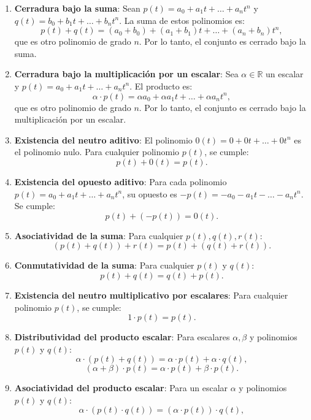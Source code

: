 \documentclass{article}
\begin{document}
\begin{enumerate}
    \item \textbf{Cerradura bajo la suma}: Sean \( p(t) = a_0 + a_1 t + \dots + a_n t^n \) y \( q(t) = b_0 + b_1 t + \dots + b_n t^n \). La suma de estos polinomios es:
    \[
    p(t) + q(t) = (a_0 + b_0) + (a_1 + b_1)t + \dots + (a_n + b_n)t^n,
    \]
    que es otro polinomio de grado \( n \). Por lo tanto, el conjunto es cerrado bajo la suma.

    \item \textbf{Cerradura bajo la multiplicación por un escalar}: Sea \( \alpha \in \mathbb{R} \) un escalar y \( p(t) = a_0 + a_1 t + \dots + a_n t^n \). El producto es:
    \[
    \alpha \cdot p(t) = \alpha a_0 + \alpha a_1 t + \dots + \alpha a_n t^n,
    \]
    que es otro polinomio de grado \( n \). Por lo tanto, el conjunto es cerrado bajo la multiplicación por un escalar.

    \item \textbf{Existencia del neutro aditivo}: El polinomio \( 0(t) = 0 + 0t + \dots + 0t^n \) es el polinomio nulo. Para cualquier polinomio \( p(t) \), se cumple:
    \[
    p(t) + 0(t) = p(t).
    \]

    \item \textbf{Existencia del opuesto aditivo}: Para cada polinomio \( p(t) = a_0 + a_1 t + \dots + a_n t^n \), su opuesto es \( -p(t) = -a_0 - a_1 t - \dots - a_n t^n \). Se cumple:
    \[
    p(t) + (-p(t)) = 0(t).
    \]

    \item \textbf{Asociatividad de la suma}: Para cualquier \( p(t), q(t), r(t) \):
    \[
    (p(t) + q(t)) + r(t) = p(t) + (q(t) + r(t)).
    \]

    \item \textbf{Conmutatividad de la suma}: Para cualquier \( p(t) \) y \( q(t) \):
    \[
    p(t) + q(t) = q(t) + p(t).
    \]

    \item \textbf{Existencia del neutro multiplicativo por escalares}: Para cualquier polinomio \( p(t) \), se cumple:
    \[
    1 \cdot p(t) = p(t).
    \]

    \item \textbf{Distributividad del producto escalar}: Para escalares \( \alpha, \beta \) y polinomios \( p(t) \) y \( q(t) \):
    \[
    \alpha \cdot (p(t) + q(t)) = \alpha \cdot p(t) + \alpha \cdot q(t),
    \]
    \[
    (\alpha + \beta) \cdot p(t) = \alpha \cdot p(t) + \beta \cdot p(t).
    \]

    \item \textbf{Asociatividad del producto escalar}: Para un escalar \( \alpha\) y polinomios \( p(t) \) y \( q(t) \):
    $$
    \alpha \cdot (p(t) \cdot q(t)) = (\alpha \cdot p(t)) \cdot q(t),
     $$

\end{enumerate}
\end{document}
